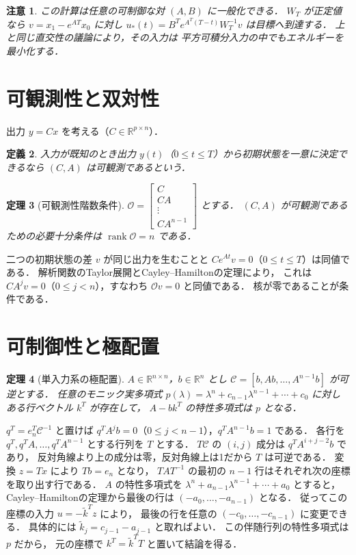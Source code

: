 \documentclass[a5paper,10pt,onecolumn]{jsarticle}
\makeatletter
\theoremstyle{mathnotetheorem}
\newtheorem{theorem}{定理}[section]
\newtheorem{definition}[theorem]{定義}
\newtheorem{remark}[theorem]{注意}
\renewcommand{\proofname}{証明}
\renewenvironment{proof}[1][\proofname]{%
  \par\pushQED{\qed}\normalfont\topsep4\p@\@plus2\p@\relax
  \trivlist\item[\hskip\labelsep\bfseries #1]\ignorespaces
}{\popQED\endtrivlist\@endpefalse}
\makeatother
\begin{document}
\begin{remark}
この計算は任意の可制御な対 $(A,B)$ に一般化できる．
$W_T$ が正定値なら $v=x_1-e^{AT}x_0$ に対し
$u_*(t)=B^Te^{A^T(T-t)}W_T^{-1}v$ は目標へ到達する．
上と同じ直交性の議論により，その入力は
平方可積分入力の中でもエネルギーを最小化する．
\end{remark}

\section{可観測性と双対性}
出力 $y=Cx$ を考える（$C\in\mathbb R^{p\times n}$）．
\begin{definition}
入力が既知のとき出力 $y(t)$（$0\le t\le T$）から初期状態を一意に決定できるなら
$(C,A)$ は可観測であるという．
\end{definition}
\begin{theorem}[可観測性階数条件]
$\mathcal O=\begin{bmatrix}C\\CA\\\vdots\\CA^{n-1}\end{bmatrix}$ とする．
$(C,A)$ が可観測であるための必要十分条件は
$\operatorname{rank}\mathcal O=n$ である．
\end{theorem}
\begin{proof}
二つの初期状態の差 $v$ が同じ出力を生むことと
$Ce^{At}v=0$（$0\le t\le T$）は同値である．
解析関数のTaylor展開とCayley--Hamiltonの定理により，
これは $CA^jv=0$（$0\le j<n$），すなわち $\mathcal Ov=0$ と同値である．
核が零であることが条件である．
\end{proof}


\section{可制御性と極配置}
\begin{theorem}[単入力系の極配置]
$A\in\mathbb R^{n\times n}$，$b\in\mathbb R^n$ とし
$\mathcal C=[b,Ab,\ldots,A^{n-1}b]$ が可逆とする．
任意のモニック実多項式
$p(\lambda)=\lambda^n+c_{n-1}\lambda^{n-1}+\cdots+c_0$ に対し
ある行ベクトル $k^T$ が存在して，
$A-bk^T$ の特性多項式は $p$ となる．
\end{theorem}
\begin{proof}
$q^T=e_n^T\mathcal C^{-1}$ と置けば
$q^TA^jb=0$（$0\le j<n-1$），$q^TA^{n-1}b=1$ である．
各行を $q^T,q^TA,\ldots,q^TA^{n-1}$ とする行列を $T$ とする．
$T\mathcal C$ の $(i,j)$ 成分は $q^TA^{i+j-2}b$ であり，
反対角線より上の成分は零，反対角線上は1だから $T$ は可逆である．
変換 $z=Tx$ により $Tb=e_n$ となり，
$TAT^{-1}$ の最初の $n-1$ 行はそれぞれ次の座標を取り出す行である．
$A$ の特性多項式を
$\lambda^n+a_{n-1}\lambda^{n-1}+\cdots+a_0$ とすると，
Cayley--Hamiltonの定理から最後の行は
$(-a_0,\ldots,-a_{n-1})$ となる．
従ってこの座標の入力 $u=-\widetilde k^Tz$ により，
最後の行を任意の
$(-c_0,\ldots,-c_{n-1})$ に変更できる．
具体的には $\widetilde k_j=c_{j-1}-a_{j-1}$ と取ればよい．
この伴随行列の特性多項式は $p$ だから，
元の座標で $k^T=\widetilde k^TT$ と置いて結論を得る．
\end{proof}
\end{document}
